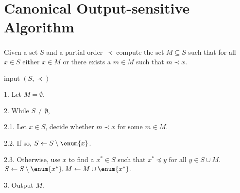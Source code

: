 \section{Canonical Output-sensitive Algorithm}
\begin{frame}\frametitle{\insertsection}\justifying
\begin{probl}
Given a set \(S\) and a partial order \(\prec\) compute the set \(M \subseteq S\)
such that for all \(x \in S\) either \(x \in M\) or there exists a \(m \in M\)
such that \(m \prec x\).
\end{probl}
\pause
\begin{algo}
\item[input] \((S, \prec)\)
\item[1.] Let \(M = \emptyset\).
\item[2.] While \(S \neq \emptyset\),
\item[2.1.] Let \(x \in S\), decide whether \(m \prec x\) for some \(m \in M\).
\item[2.2.] If so, \(S \gets S \setminus \enum{x}\).
\item[2.3.] Otherwise, use \(x\) to find a \(x^* \in S\) such that \(x^*
	\preceq y\) for all \(y \in S \cup M\). \(S \gets S \setminus \enum{x^*}, M
	\gets M \cup \enum{x^*}\).
\item[3.] Output \(M\).
\end{algo}
\end{frame}
